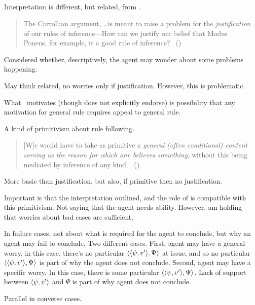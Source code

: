 \subsection{\textcite{Boghossian:2008vf}}

\begin{note}
  Interpretation is different, but related, from \textcite{Boghossian:2008vf}.

  \begin{quote}
    The Carrollian argument, \dots is meant to raise a problem for the \emph{justification} of our rules of inference---How can we justify our belief that Modus Ponens, for example, is a good rule of inference?\newline
    \mbox{ }\hfill\mbox{(\citeyear[493]{Boghossian:2008vf})}
  \end{quote}

  Considered whether, descriptively, the agent may wonder about some problems happening.

  May think related, no worries only if justification.
  However, this is problematic.

  What~\textcite{Boghossian:2008vf} motivates (though does not explicitly endorse) is possibility that any motivation for general rule requires appeal to general rule.

  A kind of primitivism about rule following.
  \begin{quote}
    [W]e would have to take as primitive a \emph{general (often conditional) content serving as the reason for which one believes something}, without this being mediated by inference of any kind.%
    \mbox{ }\hfill\mbox{(\citeyear[500]{Boghossian:2008vf})}
  \end{quote}

  More basic than justification, but also, if primitive then no justification.

  Important is that the interpretation outlined, and the role of \requ{} is compatible with this primitivism.
  Not saying that the agent needs \abspec{} ability.
  However, am holding that worries about bad cases are sufficient.

  In failure cases, not about what is required for the agent to conclude, but why an agent may fail to conclude.
  Two different cases.
  First, agent may have a general worry, in this case, there's no particular \(\langle \langle \psi, v' \rangle, \Psi \rangle\) at issue, and so no particular \(\langle \langle \psi, v' \rangle, \Psi \rangle\) is part of why the agent does not conclude.
  Second, agent may have a specific worry.
  In this case, there is some particular \(\langle \langle \psi, v' \rangle, \Psi \rangle\).
  Lack of support between \(\langle \psi, v' \rangle\) and \(\Psi\) is part of why agent does not conclude.

  Parallel in converse cases.
\end{note}

